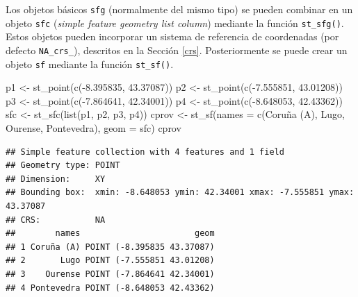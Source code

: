 \documentclass[
  spanish,
]{book}
\newenvironment{Shaded}{\begin{snugshade}}{\end{snugshade}}
\newcommand{\AttributeTok}[1]{\textcolor[rgb]{0.77,0.63,0.00}{#1}}
\newcommand{\FloatTok}[1]{\textcolor[rgb]{0.00,0.00,0.81}{#1}}
\newcommand{\FunctionTok}[1]{\textcolor[rgb]{0.00,0.00,0.00}{#1}}
\newcommand{\NormalTok}[1]{#1}
\newcommand{\OtherTok}[1]{\textcolor[rgb]{0.56,0.35,0.01}{#1}}
\newcommand{\SpecialCharTok}[1]{\textcolor[rgb]{0.00,0.00,0.00}{#1}}
\newcommand{\StringTok}[1]{\textcolor[rgb]{0.31,0.60,0.02}{#1}}
\theoremstyle{break}
\theoremstyle{definition}
\theoremstyle{definition}
\theoremstyle{definition}
\theoremstyle{definition}
\theoremstyle{remark}
\begin{document}
Los objetos básicos \texttt{sfg} (normalmente del mismo tipo) se pueden combinar en un objeto \texttt{sfc} (\emph{simple feature geometry list column}) mediante la función \texttt{st\_sfg()}.
Estos objetos pueden incorporar un sistema de referencia de coordenadas (por defecto \texttt{NA\_crs\_}), descritos en la Sección \ref{crs}.
Posteriormente se puede crear un objeto \texttt{sf} mediante la función \texttt{st\_sf()}.

\begin{Shaded}
\begin{Highlighting}[]
\NormalTok{p1 }\OtherTok{\textless{}{-}} \FunctionTok{st\_point}\NormalTok{(}\FunctionTok{c}\NormalTok{(}\SpecialCharTok{{-}}\FloatTok{8.395835}\NormalTok{, }\FloatTok{43.37087}\NormalTok{))}
\NormalTok{p2 }\OtherTok{\textless{}{-}} \FunctionTok{st\_point}\NormalTok{(}\FunctionTok{c}\NormalTok{(}\SpecialCharTok{{-}}\FloatTok{7.555851}\NormalTok{, }\FloatTok{43.01208}\NormalTok{))}
\NormalTok{p3 }\OtherTok{\textless{}{-}} \FunctionTok{st\_point}\NormalTok{(}\FunctionTok{c}\NormalTok{(}\SpecialCharTok{{-}}\FloatTok{7.864641}\NormalTok{, }\FloatTok{42.34001}\NormalTok{))}
\NormalTok{p4 }\OtherTok{\textless{}{-}} \FunctionTok{st\_point}\NormalTok{(}\FunctionTok{c}\NormalTok{(}\SpecialCharTok{{-}}\FloatTok{8.648053}\NormalTok{, }\FloatTok{42.43362}\NormalTok{))}
\NormalTok{sfc }\OtherTok{\textless{}{-}} \FunctionTok{st\_sfc}\NormalTok{(}\FunctionTok{list}\NormalTok{(p1, p2, p3, p4))}
\NormalTok{cprov }\OtherTok{\textless{}{-}} \FunctionTok{st\_sf}\NormalTok{(}\AttributeTok{names =} \FunctionTok{c}\NormalTok{(}\StringTok{\textquotesingle{}Coruña (A)\textquotesingle{}}\NormalTok{, }\StringTok{\textquotesingle{}Lugo\textquotesingle{}}\NormalTok{, }\StringTok{\textquotesingle{}Ourense\textquotesingle{}}\NormalTok{, }\StringTok{\textquotesingle{}Pontevedra\textquotesingle{}}\NormalTok{),}
    \AttributeTok{geom =}\NormalTok{ sfc)}
\NormalTok{cprov}
\end{Highlighting}
\end{Shaded}

\begin{verbatim}
## Simple feature collection with 4 features and 1 field
## Geometry type: POINT
## Dimension:     XY
## Bounding box:  xmin: -8.648053 ymin: 42.34001 xmax: -7.555851 ymax: 43.37087
## CRS:           NA
##        names                       geom
## 1 Coruña (A) POINT (-8.395835 43.37087)
## 2       Lugo POINT (-7.555851 43.01208)
## 3    Ourense POINT (-7.864641 42.34001)
## 4 Pontevedra POINT (-8.648053 42.43362)
\end{verbatim}
\end{document}
